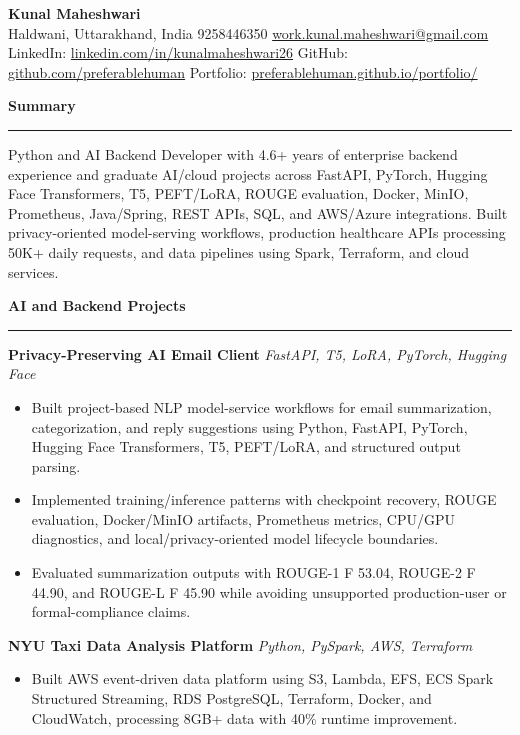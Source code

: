 \documentclass[10pt,letterpaper]{article}
\newcommand{\ressection}[1]{\vspace{3pt}\par\textbf{#1}\par\vspace{1pt}\hrule\vspace{2pt}}
\begin{document}
\pagestyle{empty}\raggedright\fontsize{10.05}{10.95}\selectfont

{\Large \textbf{Kunal Maheshwari}}\\
Haldwani, Uttarakhand, India \textbar{} 9258446350 \textbar{} \href{mailto:work.kunal.maheshwari@gmail.com}{work.kunal.maheshwari@gmail.com}\\
LinkedIn: \href{https://www.linkedin.com/in/kunalmaheshwari26}{linkedin.com/in/kunalmaheshwari26} \textbar{} GitHub: \href{https://github.com/preferablehuman}{github.com/preferablehuman} \textbar{} Portfolio: \href{https://preferablehuman.github.io/portfolio/}{preferablehuman.github.io/portfolio/}

\ressection{Summary}
Python and AI Backend Developer with 4.6+ years of enterprise backend experience and graduate AI/cloud projects across FastAPI, PyTorch, Hugging Face Transformers, T5, PEFT/LoRA, ROUGE evaluation, Docker, MinIO, Prometheus, Java/Spring, REST APIs, SQL, and AWS/Azure integrations. Built privacy-oriented model-serving workflows, production healthcare APIs processing 50K+ daily requests, and data pipelines using Spark, Terraform, and cloud services.

\ressection{AI and Backend Projects}
\textbf{Privacy-Preserving AI Email Client} \hfill \textit{FastAPI, T5, LoRA, PyTorch, Hugging Face}
\begin{itemize}
  \item Built project-based NLP model-service workflows for email summarization, categorization, and reply suggestions using Python, FastAPI, PyTorch, Hugging Face Transformers, T5, PEFT/LoRA, and structured output parsing.
  \item Implemented training/inference patterns with checkpoint recovery, ROUGE evaluation, Docker/MinIO artifacts, Prometheus metrics, CPU/GPU diagnostics, and local/privacy-oriented model lifecycle boundaries.
  \item Evaluated summarization outputs with ROUGE-1 F 53.04, ROUGE-2 F 44.90, and ROUGE-L F 45.90 while avoiding unsupported production-user or formal-compliance claims.
\end{itemize}
\textbf{NYU Taxi Data Analysis Platform} \hfill \textit{Python, PySpark, AWS, Terraform}
\begin{itemize}
  \item Built AWS event-driven data platform using S3, Lambda, EFS, ECS Spark Structured Streaming, RDS PostgreSQL, Terraform, Docker, and CloudWatch, processing 8GB+ data with 40\% runtime improvement.
\end{itemize}
\end{document}
